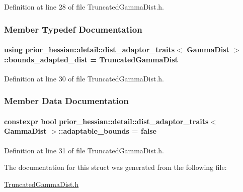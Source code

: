 Definition at line 28 of file Truncated\+Gamma\+Dist.\+h.



\subsubsection{Member Typedef Documentation}
\paragraph[{\texorpdfstring{bounds\+\_\+adapted\+\_\+dist}{bounds_adapted_dist}}]{\setlength{\rightskip}{0pt plus 5cm}using {\bf prior\+\_\+hessian\+::detail\+::dist\+\_\+adaptor\+\_\+traits}$<$ {\bf Gamma\+Dist} $>$\+::{\bf bounds\+\_\+adapted\+\_\+dist} =  {\bf Truncated\+Gamma\+Dist}}\hypertarget{structprior__hessian_1_1detail_1_1dist__adaptor__traits_3_01GammaDist_01_4_af6bc3262f73d0da5970cecd5b176ad22}{}\label{structprior__hessian_1_1detail_1_1dist__adaptor__traits_3_01GammaDist_01_4_af6bc3262f73d0da5970cecd5b176ad22}


Definition at line 30 of file Truncated\+Gamma\+Dist.\+h.



\subsubsection{Member Data Documentation}
\paragraph[{\texorpdfstring{adaptable\+\_\+bounds}{adaptable_bounds}}]{\setlength{\rightskip}{0pt plus 5cm}constexpr bool {\bf prior\+\_\+hessian\+::detail\+::dist\+\_\+adaptor\+\_\+traits}$<$ {\bf Gamma\+Dist} $>$\+::adaptable\+\_\+bounds = false\hspace{0.3cm}{\ttfamily [static]}}\hypertarget{structprior__hessian_1_1detail_1_1dist__adaptor__traits_3_01GammaDist_01_4_a9e8a0bf94b105f8c0af7c3191178e9ed}{}\label{structprior__hessian_1_1detail_1_1dist__adaptor__traits_3_01GammaDist_01_4_a9e8a0bf94b105f8c0af7c3191178e9ed}


Definition at line 31 of file Truncated\+Gamma\+Dist.\+h.



The documentation for this struct was generated from the following file\+:\begin{DoxyCompactItemize}
\item 
\hyperlink{TruncatedGammaDist_8h}{Truncated\+Gamma\+Dist.\+h}\end{DoxyCompactItemize}
